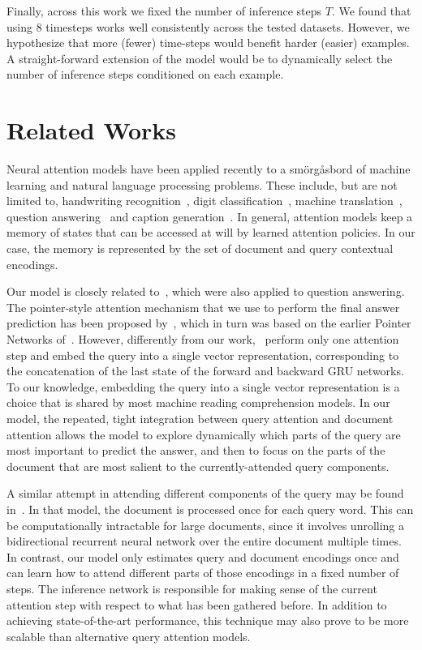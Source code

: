 \documentclass[11pt]{article}
\begin{document}
Finally, across this work we fixed the number of inference steps $T$. We found that using $8$ timesteps works well consistently across the tested datasets. However, we hypothesize that more (fewer) time-steps would benefit harder (easier) examples. A straight-forward extension of the model would be to dynamically select the number of inference steps conditioned on each example.
 
\section{Related Works}


Neural attention models have been applied recently to a sm\"org\aa sbord of machine learning and natural language processing problems. These include, but are not limited to, handwriting recognition~\cite{Graves13}, digit classification~\cite{mnih2014recurrent}, machine translation~\cite{bahdanau2014neural}, question answering~\cite{sukhbaatar2015end,hermann2015teaching} and caption generation~\cite{xu2015show}.
In general, attention models keep a memory of states that can be accessed at will by learned attention policies.
In our case, the memory is represented by the set of document and query contextual encodings.


Our model is closely related to~\cite{sukhbaatar2015end,kumar2015ask,hermann2015teaching,watson,hill2015goldilocks}, which were also applied to question answering.
The pointer-style attention mechanism that we use to perform the final answer prediction has been proposed by~\cite{watson}, which in turn was based on the earlier Pointer Networks of~\cite{vinyals2015pointer}.  However, differently from our work,~\cite{watson} perform only one attention step and embed the query into a single vector representation, corresponding to the concatenation of the last state of the forward and backward GRU networks. To our knowledge, embedding the query into a single vector representation is a choice that is shared by most machine reading comprehension models. In our model, the repeated, tight integration between query attention and document attention allows the model to explore dynamically which parts of the query are most important to predict the answer, and then to focus on the parts of the document that are most salient to the currently-attended query components.

A similar attempt in attending different components of the query may be found in~\cite{hermann2015teaching}. In that model, the document is processed once for each query word. This can be computationally intractable for large documents, since it involves unrolling a bidirectional recurrent neural network over the entire document multiple times. In contrast, our model only estimates query and document encodings once and can learn how to attend different parts of those encodings in a fixed number of steps. The inference network is responsible for making sense of the current attention step with respect to what has been gathered before. In addition to achieving state-of-the-art performance, this technique may also prove to be more scalable than alternative query attention models.
\end{document}
